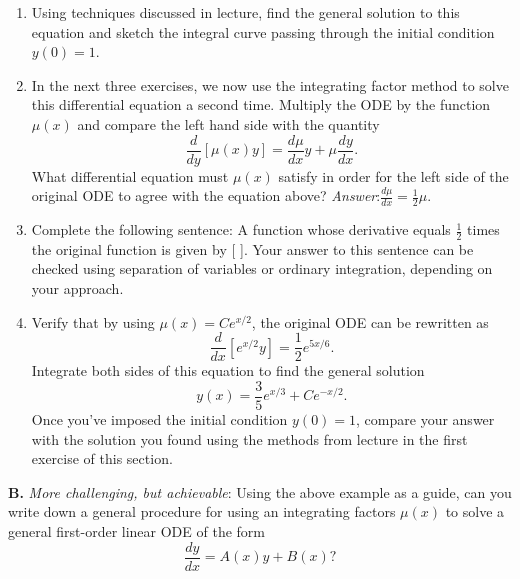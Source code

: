 \documentclass[11pt,a4paper,twoside]{article}
\begin{document}
	\begin{enumerate}[\bfseries 1)]
		\item Using techniques discussed in lecture, find the general solution to this equation and sketch the integral curve passing through the initial condition $y(0) = 1$.
		\item In the next three exercises, we now use the integrating factor method to solve this differential equation a second time. Multiply the ODE by the function $\mu(x)$ and compare the left hand side with the quantity
		$$
		\frac{d}{dy}[\mu(x)y] = \frac{d\mu}{dx}y+\mu\frac{dy}{dx}.
		$$
		What differential equation must $\mu(x)$ satisfy in order for the left side of the original ODE to agree with the equation above? \textit{Answer}:$\frac{d\mu}{dx} = \frac{1}{2}\mu$.
		\item Complete the following sentence: A function whose derivative equals $\frac{1}{2}$ times the original function is given by [ ]. Your answer to this sentence can be checked using separation of variables or ordinary integration, depending on your approach.
		\item Verify that by using $\mu(x) = Ce^{x/2}$, the original ODE can be rewritten as
		$$
		\frac{d}{dx}[e^{x/2}y] = \frac{1}{2}e^{5x/6}.
		$$
		Integrate both sides of this equation to find the general solution
		$$
		y(x) = \frac{3}{5}e^{x/3} + Ce^{-x/2}.
		$$
		Once you’ve imposed the initial condition $y(0) = 1$, compare your answer with the solution you found using the methods from lecture in the first exercise of this section.
	\end{enumerate}
	\textbf{B.} \textit{More challenging, but achievable}: Using the above example as a guide, can you write down a general procedure for using an integrating factors $\mu(x)$ to solve a general first-order linear ODE of the form
	$$
	\frac{dy}{dx} = A(x)y + B(x)?
	$$
\end{document}
